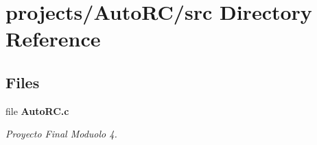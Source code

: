 \section{projects/\+Auto\+R\+C/src Directory Reference}
\label{dir_d066db0b6cc65c585332597023804074}
\subsection*{Files}
\begin{DoxyCompactItemize}
\item 
file \textbf{ Auto\+R\+C.\+c}
\begin{DoxyCompactList}\small\item\em Proyecto Final Moduolo 4. \end{DoxyCompactList}\end{DoxyCompactItemize}
